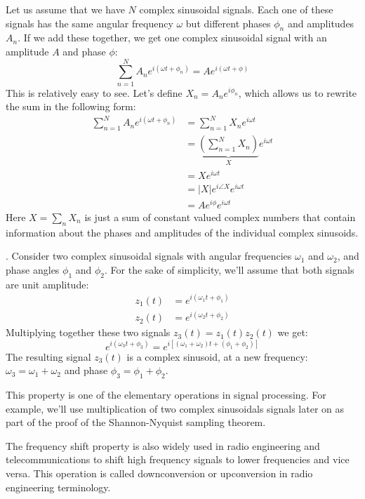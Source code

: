 Let us assume that we have $N$ complex sinusoidal signals. Each one of these signals has the same angular frequency $\omega$ but different phases $\phi_n$ and amplitudes $A_n$. If we add these together, we get one complex sinusoidal signal with an amplitude $A$ and phase $\phi$:
\begin{equation}
\sum_{n=1}^N A_n e^{i(\omega t + \phi_n)} = A e^{i (\omega t + \phi)}
\end{equation}
This is relatively easy to see. Let's define $X_n = A_n e^{i\phi_n}$, which allows us to rewrite the sum in the following form:
\begin{align}
\sum_{n=1}^N A_n e^{i(\omega t + \phi_n)} &= \sum_{n=1}^N X_n e^{i\omega t} \\
&= \underbrace{\left(\sum_{n=1}^N X_n\right)}_{X} e^{i\omega t} \\
&= X e^{i\omega t}\\
&= |X| e^{i\angle X} e^{i\omega t}\\
&= A e^{i \phi} e^{i\omega t}
\label{eq:sum_sinusoids}
\end{align}
Here $X=\sum_n X_n$ is just a sum of constant valued complex numbers that contain information about the phases and amplitudes of the individual complex sinusoids.

.
Consider two complex sinusoidal signals with angular frequencies $\omega_1$ and $\omega_2$, and phase angles $\phi_1$ and $\phi_2$. For the sake of simplicity, we'll assume that both signals are unit amplitude:
\begin{align}
z_1(t) &=  e^{i(\omega_1 t + \phi_1)}\\
z_2(t) &=  e^{i(\omega_2 t + \phi_2)}
\end{align}
Multiplying together these two signals $z_3(t) = z_1(t)z_2(t)$ we get:
\begin{equation}
\boxed{e^{i(\omega_3 t + \phi_3)}  = e^{i[(\omega_1 + \omega_2) t + (\phi_1+\phi_2)]}}
\label{eq:freqmix}
\end{equation}
The resulting signal $z_3(t)$ is a complex sinusoid, at a new frequency: $\omega_3 = \omega_1 + \omega_2$ and phase $\phi_3=\phi_1+\phi_2$.

This property is one of the elementary operations in signal
processing. For example, we'll use multiplication of two complex sinusoidals signals later on as part of the proof of the Shannon-Nyquist sampling theorem.

The frequency shift property is also widely used in radio engineering and telecommunications to shift high frequency signals to lower frequencies and vice versa. This operation is called downconversion or upconversion in radio engineering terminology.

